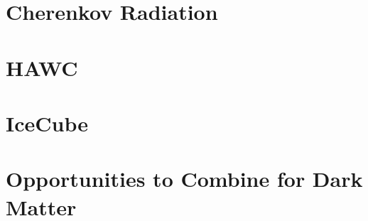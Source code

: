 \section{Cherenkov Radiation\label{sec:cherenkov}}

\section{HAWC\label{sec:hawc_intro}}

\section{IceCube\label{sec:ice3_intro}}

\section{Opportunities to Combine for Dark Matter\label{sec:ic3_hawc_combo}}
